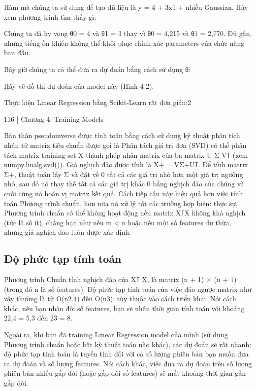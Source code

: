 Hàm mà chúng ta sử dụng để tạo dữ liệu là y = 4 + 3x1 + nhiễu Gaussian. Hãy xem phương trình tìm thấy gì:

Chúng ta đã hy vọng θ0 = 4 và θ1 = 3 thay vì θ0 = 4,215 và θ1 = 2,770. Đủ gần, nhưng tiếng ồn khiến không thể khôi phục chính xác parameters của chức năng ban đầu.

Bây giờ chúng ta có thể đưa ra dự đoán bằng cách sử dụng θ:

Hãy vẽ đồ thị dự đoán của model này (Hình 4-2):

Thực hiện Linear Regression bằng Scikit-Learn rất đơn giản:2

116 | Chương 4: Training Models

Bản thân pseudoinverse được tính toán bằng cách sử dụng kỹ thuật phân tích nhân tử matrix tiêu chuẩn được gọi là Phân tách giá trị đơn (SVD) có thể phân tách matrix training set X thành phép nhân matrix của ba matrix U Σ V⊺ (xem numpy.linalg.svd()). Giả nghịch đảo được tính là X+ = VΣ+U⊺. Để tính matrix Σ+, thuật toán lấy Σ và đặt về 0 tất cả các giá trị nhỏ hơn một giá trị ngưỡng nhỏ, sau đó nó thay thế tất cả các giá trị khác 0 bằng nghịch đảo của chúng và cuối cùng nó hoán vị matrix kết quả. Cách tiếp cận này hiệu quả hơn việc tính toán Phương trình chuẩn, hơn nữa nó xử lý tốt các trường hợp biên: thực sự, Phương trình chuẩn có thể không hoạt động nếu matrix X⊺X không khả nghịch (tức là số ít), chẳng hạn như nếu m < n hoặc nếu một số features dư thừa, nhưng giả nghịch đảo luôn được xác định.

\subsection{Độ phức tạp tính toán}

Phương trình Chuẩn tính nghịch đảo của X⊺ X, là matrix (n + 1) × (n + 1) (trong đó n là số features). Độ phức tạp tính toán của việc đảo ngược matrix như vậy thường là từ O(n2.4) đến O(n3), tùy thuộc vào cách triển khai. Nói cách khác, nếu bạn nhân đôi số features, bạn sẽ nhân thời gian tính toán với khoảng 22,4 = 5,3 đến 23 = 8.

Ngoài ra, khi bạn đã training Linear Regression model của mình (sử dụng Phương trình chuẩn hoặc bất kỳ thuật toán nào khác), các dự đoán sẽ rất nhanh: độ phức tạp tính toán là tuyến tính đối với cả số lượng phiên bản bạn muốn đưa ra dự đoán và số lượng features. Nói cách khác, việc đưa ra dự đoán trên số lượng phiên bản nhiều gấp đôi (hoặc gấp đôi số features) sẽ mất khoảng thời gian gần gấp đôi.

